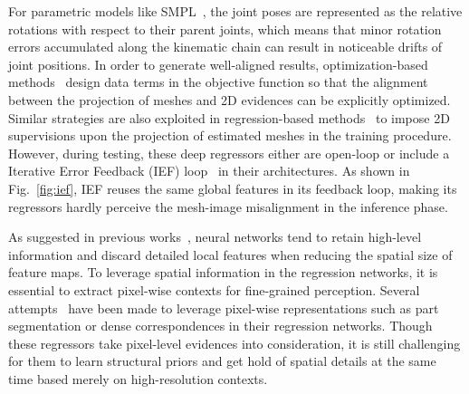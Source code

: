 \documentclass[10pt,twocolumn,letterpaper]{article}
\begin{document}
For parametric models like SMPL~\cite{loper2015smpl}, the joint poses are represented as the relative rotations with respect to their parent joints, which means that minor rotation errors accumulated along the kinematic chain can result in noticeable drifts of joint positions.
In order to generate well-aligned results, optimization-based methods~\cite{bogo2016keep,lassner2017unite} design data terms in the objective function so that the alignment between the projection of meshes and 2D evidences can be explicitly optimized.
Similar strategies are also exploited in regression-based methods~\cite{kanazawa2018end,pavlakos2018learning,kolotouros2019convolutional,kolotouros2019learning} to impose 2D supervisions upon the projection of estimated meshes in the training procedure.
However, during testing, these deep regressors either are open-loop or include a Iterative Error Feedback (IEF) loop~\cite{kanazawa2018end} in their architectures.
As shown in Fig.~\ref{fig:ief}, IEF reuses the same global features in its feedback loop, making its regressors hardly perceive the mesh-image misalignment in the inference phase.


As suggested in previous works~\cite{ronneberger2015u,newell2016stacked,lin2017feature,sun2019deep}, neural networks tend to retain high-level information and discard detailed local features when reducing the spatial size of feature maps.
To leverage spatial information in the regression networks, it is essential to extract pixel-wise contexts for fine-grained perception.
Several attempts~\cite{omran2018neural,xu2019denserac,zhang2019danet} have been made to leverage pixel-wise representations such as part segmentation or dense correspondences in their regression networks.
Though these regressors take pixel-level evidences into consideration, it is still challenging for them to learn structural priors and get hold of spatial details at the same time based merely on high-resolution contexts.
\end{document}
